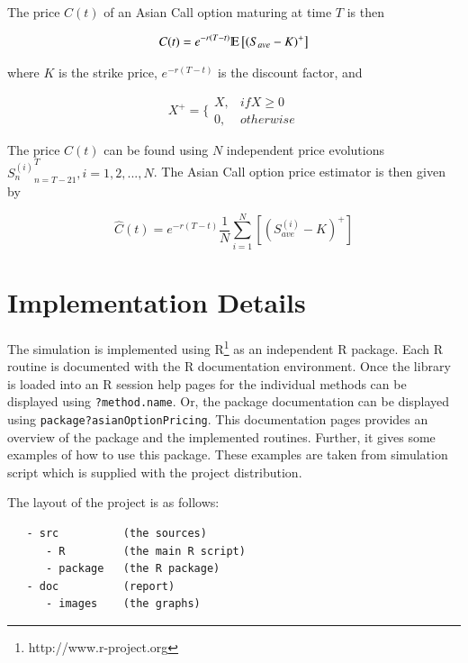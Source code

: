 \documentclass[12pt,a4paper]{article}
\begin{document}
The price $C(t)$ of an Asian Call option maturing at time $T$ is then

\begin{equation}
  \label{eq:Asiancallprice}
  C(t)=e^{-r(T-t)}\varmathbb{E}\left[\left(S_{ave}-K\right)^{+}\right]
\end{equation}

where $K$ is the strike price, $e^{-r(T-t)}$ is the discount factor,
and

\begin{equation}
  \label{eq:4}
  X^{+}=\biggl\lbrace
  \begin{array}{cc}
    X, & if X \geq 0 \\
    0, & otherwise
  \end{array}
\end{equation}

The price $C(t)$ can be found using $N$ independent price evolutions
${S_{n}^{(i)}}_{n=T-21}^{T}, i=1,2,...,N$. The Asian Call option price
estimator is then given by

\begin{equation}
  \label{eq:Asiancallestimator}
  \hat{C}(t)=e^{-r(T-t)}\frac{1}{N}\sum_{i=1}^{N}\left[\left(S_{ave}^{(i)}-K\right)^{+}\right]
\end{equation}

\section{Implementation Details}
\label{sec:impl-deta}

The simulation is implemented using
R\footnote{http://www.r-project.org} as an independent R package.
Each R routine is documented with the R documentation
environment. Once the library is loaded into an R session help pages
for the individual methods can be displayed using
\verb=?method.name=. Or, the package documentation can be displayed
using \verb=package?asianOptionPricing=. This documentation pages
provides an overview of the package and the implemented
routines. Further, it gives some examples of how to use this
package. These examples are taken from simulation script which is
supplied with the project distribution.

The layout of the project is as follows:

\begin{verbatim}
   - src          (the sources)
      - R         (the main R script)
      - package   (the R package)
   - doc          (report)
      - images    (the graphs)
\end{verbatim}
\end{document}
